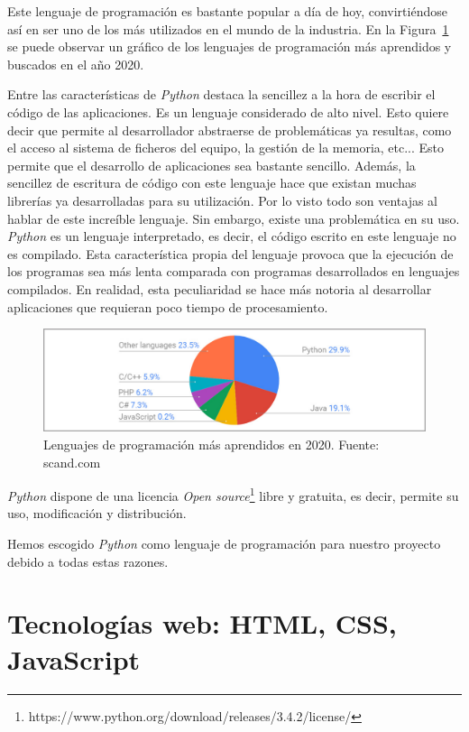 \documentclass[a4paper, 12pt]{book}
\begin{document}
Este lenguaje de programación es bastante popular a día de hoy, convirtiéndose
así en ser uno de los más utilizados en el mundo de la industria.
En la Figura~\ref{figura:lenguajes_programacion} se puede observar un
gráfico de los lenguajes de programación más aprendidos y buscados en
el año 2020.

Entre las características de \textit{Python} destaca la sencillez a la hora de
escribir el código de las
aplicaciones. Es un lenguaje considerado de alto nivel. Esto quiere decir
que permite al desarrollador abstraerse de problemáticas ya resultas, como
el acceso al sistema de ficheros del equipo, la gestión de la memoria, etc...
Esto permite que el desarrollo de aplicaciones sea bastante sencillo.
Además, la sencillez de escritura de código con este lenguaje hace que
existan muchas librerías ya desarrolladas para su utilización.
Por lo visto todo son ventajas al hablar de este increíble lenguaje. Sin
embargo, existe una problemática en su uso. \textit{Python} es un lenguaje
interpretado, es decir, el código escrito en este lenguaje no es compilado.
Esta característica propia del lenguaje provoca que la ejecución de los
programas sea más lenta comparada con programas desarrollados en lenguajes
compilados. En realidad, esta peculiaridad se hace más notoria al 
desarrollar aplicaciones que requieran poco tiempo de procesamiento.

\begin{figure}
  \centering
  \includegraphics[width=12cm, keepaspectratio]{img/The-most-learned-languages}
  \caption{Lenguajes de programación más aprendidos en 2020. Fuente: scand.com}
  \label{figura:lenguajes_programacion}
\end{figure}

\textit{Python} dispone de una licencia \textit{Open source}\footnote{https://www.python.org/download/releases/3.4.2/license/}
libre y gratuita,
es decir, permite su uso, modificación y distribución.

Hemos escogido \textit{Python} como lenguaje de programación para nuestro proyecto
debido a todas estas razones.

\section{Tecnologías web: HTML, CSS, JavaScript} 
\label{sec:tecnologias_web}
\end{document}

